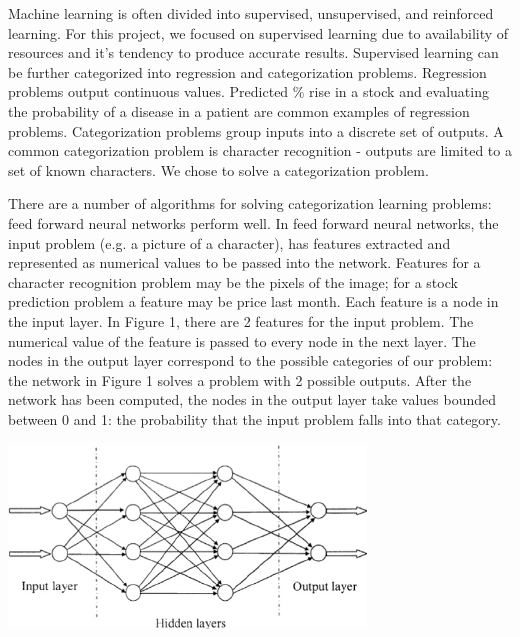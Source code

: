 \documentclass{article}
\newenvironment{Figure}
  {\par\medskip\noindent\minipage{\linewidth}}
  {\endminipage\par\medskip}
\begin{document}
\begin{multicols}{2}

	Machine learning is often divided into supervised, unsupervised, and reinforced learning. For this project, we focused on supervised learning due to availability of resources and it’s tendency to produce accurate results. Supervised learning can be further categorized into regression and categorization problems. Regression problems output continuous values. Predicted \% rise in a stock and evaluating the probability of a disease in a patient are common examples of regression problems. Categorization problems group inputs into a discrete set of outputs. A common categorization problem is character recognition - outputs are limited to a set of known characters. We chose to solve a categorization problem.
\par
There are a number of algorithms for solving categorization learning problems: feed forward neural networks perform well. In feed forward neural networks, the input problem (e.g. a picture of a character), has features extracted and represented as numerical values to be passed into the network. Features for a character recognition problem may be the pixels of the image; for a stock prediction problem a feature may be price last month. Each feature is a node in the input layer. In Figure 1, there are 2 features for the input problem. The numerical value of the feature is passed to every node in the next layer. The nodes in the output layer correspond to the possible categories of our problem: the network in Figure 1 solves a problem with 2 possible outputs. After the network has been computed, the nodes in the output layer take values bounded between 0 and 1: the probability that the input problem falls into that category.
\begin{Figure}
 \centering
 \includegraphics[width=\linewidth]{FFNN_Schematic}

\end{Figure}
\end{multicols}
\end{document}
